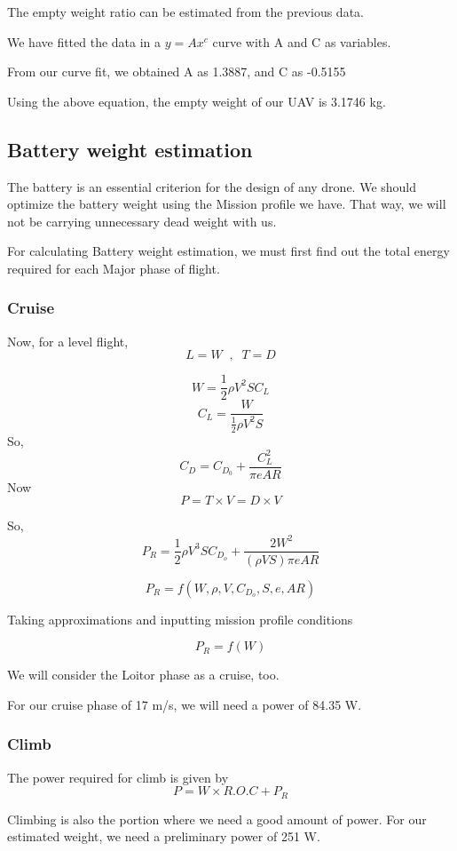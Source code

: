 \documentclass[12 pt]{article}
\begin{document}
The empty weight ratio can be estimated from the previous data. 

We have fitted the data in a $y = A x^c$ curve with A and C as variables.

From our curve fit, we obtained A as 1.3887, and C as -0.5155

Using the above equation, the empty weight of our UAV is 3.1746 kg.

\newpage

\subsection{Battery weight estimation}

The battery is an essential criterion for the design of any drone. We should optimize the battery weight using the Mission profile we have. That way, we will not be carrying unnecessary dead weight with us.

For calculating Battery weight estimation, we must first find out the total energy required for each Major phase of flight.

\subsubsection{Cruise}
Now, for a level flight,
$$ L = W \; \; , \; \; T = D$$

$$ W = \frac{1}{2} \rho V^2 S C_L $$
$$ C_L = \frac{W}{\frac{1}{2} \rho V^2 S}$$
So,
$$ C_D = C_{D_0} + \frac{C_L^2}{\pi e AR} $$
Now 
$$ P = T\times V = D\times V $$

So, 
$$ P_R = \frac{1}{2}\rho V^3 S C_{D_o} + \frac{2 W^2}{ (\rho V S) \pi e AR} $$

$$P_R = f(W,\rho,V,C_{D_o},S,e,AR)$$

Taking approximations and inputting mission profile conditions

$$ P_R = f(W) $$

We will consider the Loitor phase as a cruise, too.

For our cruise phase of 17 m/s, we will need a power of 84.35 W.

\subsubsection{Climb }
The power required for climb is given by 
$$ P = W \times R.O.C + P_R $$

Climbing is also the portion where we need a good amount of power. For our estimated weight, we need a preliminary power of 251 W.
\end{document}
